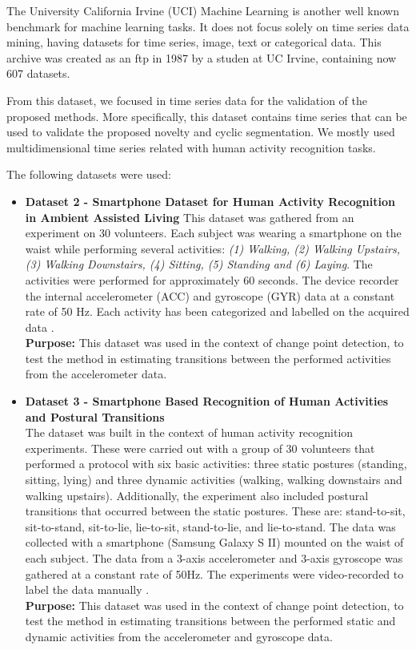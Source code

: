 The University California Irvine (UCI) Machine Learning is another well known benchmark for machine learning tasks. It does not focus solely on time series data mining, having datasets for time series, image, text or categorical data. This archive was created as an ftp in 1987 by a studen at UC Irvine, containing now 607 datasets. 
\par
From this dataset, we focused in time series data for the validation of the proposed methods. More specifically, this dataset contains time series that can be used to validate the proposed novelty and cyclic segmentation. We mostly used multidimensional time series related with human activity recognition tasks.
\par
The following datasets were used:
\begin{itemize}
\item \textbf{Dataset 2 - Smartphone Dataset for Human Activity Recognition in Ambient Assisted Living} This dataset was gathered from an experiment on 30 volunteers. Each subject was wearing a smartphone on the waist while performing several activities: \textit{(1) Walking, (2) Walking Upstairs, (3) Walking Downstairs, (4) Sitting, (5) Standing and (6) Laying}. The activities were performed for approximately 60 seconds. The device recorder the internal accelerometer (ACC) and gyroscope (GYR) data at a constant rate of 50 Hz. Each activity has been categorized and labelled on the acquired data \cite{dataset2, dataset2_2}.\\
\textbf{Purpose:} This dataset was used in the context of change point detection, to test the method in estimating transitions between the performed activities from the accelerometer data.
    
\item \textbf{Dataset 3 - Smartphone Based Recognition of Human Activities and Postural Transitions}\\
The dataset was built in the context of human activity recognition experiments. These were carried out with a group of 30 volunteers that performed a protocol with six basic activities: three static postures (standing, sitting, lying) and three dynamic activities (walking, walking downstairs and walking upstairs). Additionally, the experiment also included postural transitions that occurred between the static postures. These are: stand-to-sit, sit-to-stand, sit-to-lie, lie-to-sit, stand-to-lie, and lie-to-stand. The data was collected with a smartphone (Samsung Galaxy S II) mounted on the waist of each subject. The data from a 3-axis accelerometer and 3-axis gyroscope was gathered at a constant rate of 50Hz. The experiments were video-recorded to label the data manually \cite{dataset3}.\\
\textbf{Purpose:} This dataset was used in the context of change point detection, to test the method in estimating transitions between the performed static and dynamic activities from the accelerometer and gyroscope data.


\end{itemize}
